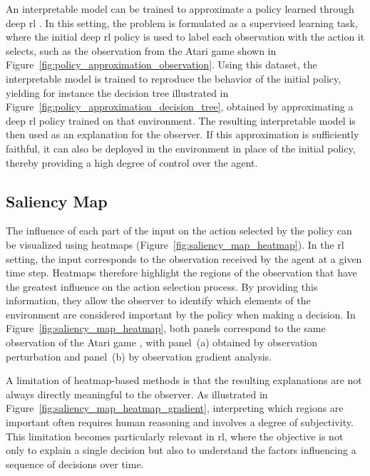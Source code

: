 An interpretable model can be trained to approximate a policy learned through deep \gls{rl} \parencite{sieusahai2021explaining}.
In this setting, the problem is formulated as a supervised learning task, where the initial deep \gls{rl} policy is used to label each observation with the action it selects, such as the observation from the Atari game \PongName shown in Figure~\ref{fig:policy_approximation_observation}.
Using this dataset, the interpretable model is trained to reproduce the behavior of the initial policy, yielding for instance the decision tree illustrated in Figure~\ref{fig:policy_approximation_decision_tree}, obtained by approximating a deep \gls{rl} policy trained on that environment.
The resulting interpretable model is then used as an explanation for the observer.
If this approximation is sufficiently faithful, it can also be deployed in the environment in place of the initial policy, thereby providing a high degree of control over the agent.



\subsection{Saliency Map}
\label{subsec:saliency_map}

The influence of each part of the input on the action selected by the policy can be visualized using heatmaps (Figure~\ref{fig:saliency_map_heatmap}).
In the \gls{rl} setting, the input corresponds to the observation received by the agent at a given time step.
Heatmaps therefore highlight the regions of the observation that have the greatest influence on the action selection process.
By providing this information, they allow the observer to identify which elements of the environment are considered important by the policy when making a decision.
In Figure~\ref{fig:saliency_map_heatmap}, both panels correspond to the same observation of the Atari game \BreakoutName, with panel~(a) obtained by observation perturbation and panel~(b) by observation gradient analysis.



A limitation of heatmap-based methods is that the resulting explanations are not always directly meaningful to the observer.
As illustrated in Figure~\ref{fig:saliency_map_heatmap_gradient}, interpreting which regions are important often requires human reasoning and involves a degree of subjectivity.
This limitation becomes particularly relevant in \gls{rl}, where the objective is not only to explain a single decision but also to understand the factors influencing a sequence of decisions over time.

